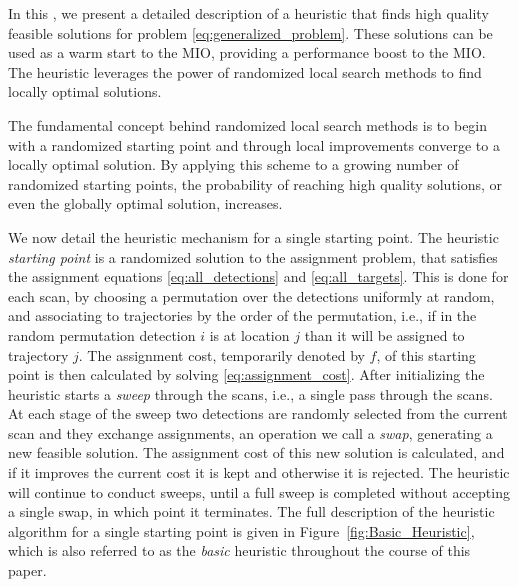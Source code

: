 In this \mytitle, we present a detailed description of a heuristic that finds high quality feasible solutions for problem \eqref{eq:generalized_problem}. These solutions can be used as a warm start to the MIO, providing a performance boost to the MIO. The heuristic leverages the power of randomized local search methods to find locally optimal solutions. 

The fundamental concept behind randomized local search methods is to begin with a randomized starting point and through local improvements converge to a locally optimal solution. By applying this scheme to a growing number of randomized starting points, the probability of reaching high quality solutions, or even the globally optimal solution, increases.

We now detail the heuristic mechanism for a single starting point. The heuristic \textit{starting point} is a randomized solution to the assignment problem, that satisfies the assignment equations \eqref{eq:all_detections} and \eqref{eq:all_targets}. This is done for each scan, by choosing a permutation over the detections uniformly at random, and associating to trajectories by the order of the permutation, i.e., if in the random permutation detection $i$ is at location $j$ than it will be assigned to trajectory $j$. The assignment cost, temporarily denoted by $f$, of this starting point is then calculated by solving \eqref{eq:assignment_cost}. After initializing the heuristic starts a \textit{sweep} through the scans, i.e., a single pass through the scans. At each stage of the sweep two detections are randomly selected from the current scan and they exchange assignments, an operation we call a \textit{swap}, generating a new feasible solution. The assignment cost of this new solution is calculated, and if it improves the current cost it is kept and otherwise it is rejected. The heuristic will continue to conduct sweeps, until a full sweep is completed without accepting a single swap, in which point it terminates. The full description of the heuristic algorithm for a single starting point is given in Figure~\ref{fig:Basic_Heuristic}, which is also referred to as the \textit{basic} heuristic throughout the course of this paper. 
